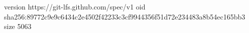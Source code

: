 version https://git-lfs.github.com/spec/v1
oid sha256:89772c9e9c6434c2e4502f42233c3cf9944356f51d72e234483a8b54ec165bb3
size 5063

